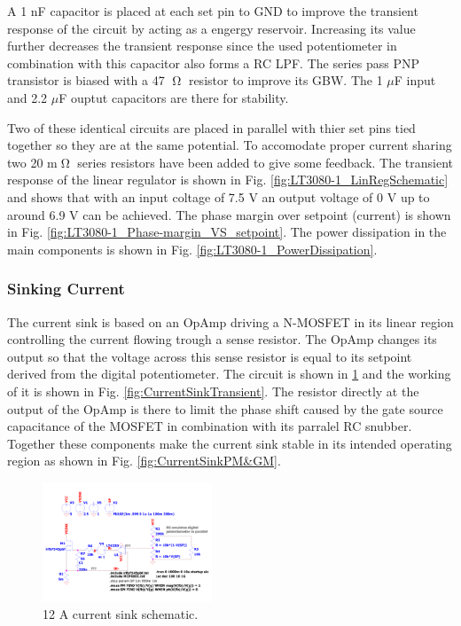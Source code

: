 A 1 nF capacitor is placed at each set pin to GND to improve the transient response of the circuit by acting as a engergy reservoir. Increasing its value further decreases the transient response since the used potentiometer in combination with this capacitor also forms a RC LPF. The series pass PNP transistor is biased with a 47 $\tcohm$ resistor to improve its GBW. The 1 $\mu$F input and 2.2 $\mu$F ouptut capacitors are there for stability.

Two of these identical circuits are placed in parallel with thier set pins tied together so they are at the same potential. To accomodate proper current sharing two 20 m$\tcohm$ series resistors have been added to give some feedback.
The transient response of the linear regulator is shown in Fig. \ref{fig:LT3080-1_LinRegSchematic} and shows that with an input coltage of 7.5 V an output voltage of 0 V up to around 6.9 V can be achieved. The phase margin over setpoint (current) is shown in Fig. \ref{fig:LT3080-1_Phase-margin_VS_setpoint}. The power dissipation in the main components is shown in Fig. \ref{fig:LT3080-1_PowerDissipation}.

\subsubsection{Sinking Current}
The current sink is based on an OpAmp driving a N-MOSFET in its linear region controlling the current flowing trough a sense resistor. The OpAmp changes its output so that the voltage across this sense resistor is equal to its setpoint derived from the digital potentiometer. The circuit is shown in \ref{fig:CurrentSinkSchematic} and the working of it is shown in Fig. \ref{fig:CurrentSinkTransient}. The resistor directly at the output of the OpAmp is there to limit the phase shift caused by the gate source capacitance of the MOSFET in combination with its parralel RC snubber. Together these components make the current sink stable in its intended operating region as shown in Fig. \ref{fig:CurrentSinkPM&GM}.

\begin{figure}[h!]
    \centering
    \includegraphics[width=0.45\textwidth]{CurrentSinkSchematic.pdf}
    \caption{12 A current sink schematic.}
    \label{fig:CurrentSinkSchematic}
\end{figure}

